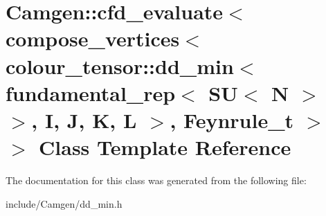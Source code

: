 \hypertarget{a00060}{\section{Camgen\-:\-:cfd\-\_\-evaluate$<$ compose\-\_\-vertices$<$ colour\-\_\-tensor\-:\-:dd\-\_\-min$<$ fundamental\-\_\-rep$<$ S\-U$<$ N $>$ $>$, I, J, K, L $>$, Feynrule\-\_\-t $>$ $>$ Class Template Reference}
\label{a00060}
}


The documentation for this class was generated from the following file\-:\begin{DoxyCompactItemize}
\item 
include/\-Camgen/dd\-\_\-min.\-h\end{DoxyCompactItemize}
